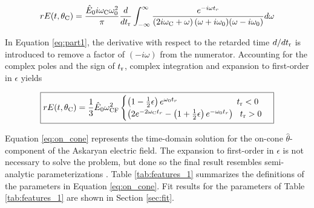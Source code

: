 \documentclass[amsmath,amssymb,aps,prd,10pt,twocolumn]{revtex4}
\begin{document}
\begin{widetext}
\begin{equation}
r E(t,\theta_{\rm C}) = \frac{\hat{E}_0 i \omega_{\rm C} \omega_{\rm 0}^2}{\pi} \frac{d}{dt_{\rm r}}\int_{-\infty}^{\infty} \frac{ e^{-i\omega t_r}}{ \left(2 i \omega_{\rm C} + \omega \right) (\omega+i\omega_{\rm 0}) (\omega - i\omega_{\rm 0}) } d\omega \label{eq:part1}
\end{equation}
\end{widetext}

In Equation \ref{eq:part1}, the derivative with respect to the retarded time $d/dt_{\rm r}$ is introduced to remove a factor of $(-i\omega)$ from the numerator.  Accounting for the complex poles and the sign of $t_{\rm r}$, complex integration and expansion to first-order in $\epsilon$ yields

\begin{widetext}
\begin{equation}
\boxed{
r E(t,\theta_{\rm C}) = \frac{1}{3} \hat{E}_0 \omega_{\rm CF}^2
\begin{cases}
\left(1 - \frac{1}{2}\epsilon \right)e^{\omega_{\rm 0} t_r} ~~~~~~~~~~~~~~~~~~~~~ t_{\rm r} < 0 \\
\left( 2 e^{-2\omega_{\rm C} t_r} - \left(1+\frac{1}{2}\epsilon \right) e^{-\omega_{\rm 0}t_r} \right) ~~ t_{\rm r} > 0
\end{cases}
} \label{eq:on_cone}
\end{equation}
\end{widetext}

Equation \ref{eq:on_cone} represents the time-domain solution for the on-cone $\hat{\theta}$-component of the Askaryan electric field.  The expansion to first-order in $\epsilon$ is not necessary to solve the problem, but done so the final result resembles semi-analytic parameterizations \cite{10.1103/physrevd.84.103003,PhysRevD.101.083005}. Table \ref{tab:features_1} summarizes the definitions of the parameters in Equation \ref{eq:on_cone}.  Fit results for the parameters of Table \ref{tab:features_1} are shown in Section \ref{sec:fit}.
\end{document}
